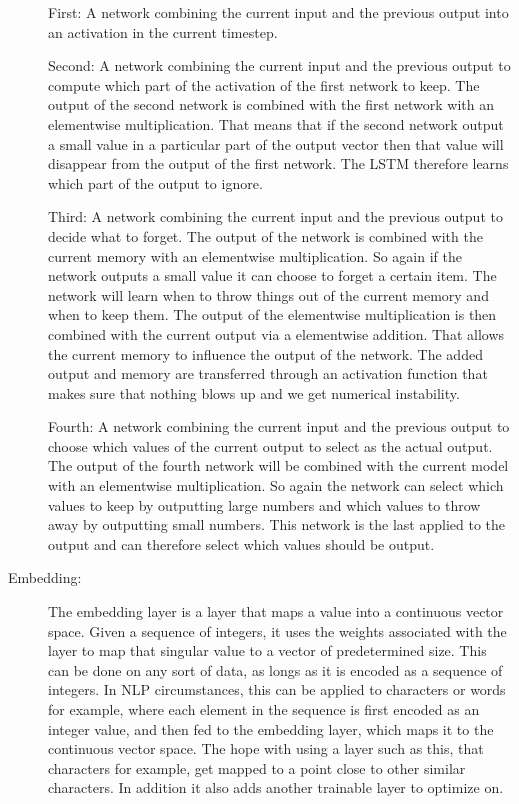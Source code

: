 \begin{description}
        First: A network combining the current input and the previous output
        into an activation in the current timestep.

        Second: A network combining the current input and the previous output to
        compute which part of the activation of the first network to keep. The
        output of the second network is combined with the first network with an
        elementwise multiplication. That means that if the second network output
        a small value in a particular part of the output vector then that value
        will disappear from the output of the first network. The \gls{LSTM}
        therefore learns which part of the output to ignore.

        Third: A network combining the current input and the previous output
        to decide what to forget. The output of the network is combined with
        the current memory with an elementwise multiplication. So again if the
        network outputs a small value it can choose to forget a certain item.
        The network will learn when to throw things out of the current memory
        and when to keep them. The output of the elementwise multiplication is
        then combined with the current output via a elementwise addition. That
        allows the current memory to influence the output of the network. The
        added output and memory are transferred through an activation function
        that makes sure that nothing blows up and we get numerical instability.

        Fourth: A network combining the current input and the previous output
        to choose which values of the current output to select as the actual
        output. The output of the fourth network will be combined with the
        current model with an elementwise multiplication. So again the network
        can select which values to keep by outputting large numbers and which
        values to throw away by outputting small numbers. This network is the
        last applied to the output and can therefore select which values should
        be output.

    \item[Embedding:]

        The embedding layer is a layer that maps a value into a continuous
        vector space. Given a sequence of integers, it uses the weights
        associated with the layer to map that singular value to a vector of
        predetermined size. This can be done on any sort of data, as longs as it
        is encoded as a sequence of integers. In \gls{NLP} circumstances, this
        can be applied to characters or words for example, where each element in
        the sequence is first encoded as an integer value, and then fed to the
        embedding layer, which maps it to the continuous vector space. The hope
        with using a layer such as this, that characters for example, get mapped
        to a point close to other similar characters. In addition it also adds
        another trainable layer to optimize on.


\end{description}
